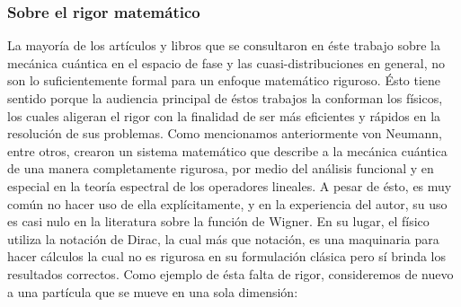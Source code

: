 \documentclass[a4paper]{report}
\begin{document}
  \subsubsection{Sobre el rigor matemático}

  La mayoría de los artículos y libros que se consultaron en
  éste trabajo sobre la mecánica cuántica en el espacio de
  fase y las cuasi-distribuciones en general, no son lo
  suficientemente formal para un enfoque matemático
  riguroso. Ésto tiene sentido porque la audiencia principal
  de éstos trabajos la conforman los físicos, los cuales
  aligeran el rigor con la finalidad de ser más eficientes y
  rápidos en la resolución de sus problemas.  Como
  mencionamos anteriormente von Neumann, entre otros,
  crearon un sistema matemático que describe a la mecánica
  cuántica de una manera completamente rigurosa, por medio
  del análisis funcional y en especial en la teoría
  espectral de los operadores lineales.  A pesar de ésto, es
  muy común no hacer uso de ella explícitamente, y en la
  experiencia del autor, su uso es casi nulo en la literatura
  sobre la función de Wigner. En su lugar, el físico utiliza
  la notación de Dirac, la cual más que notación, es una
  maquinaria para hacer cálculos la cual no es rigurosa en
  su formulación clásica pero sí brinda los resultados
  correctos. Como ejemplo de ésta falta de rigor,
  consideremos de nuevo a una partícula que se mueve en una
  sola dimensión:
\end{document}
